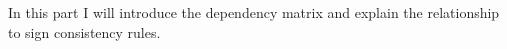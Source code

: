 In this part I will introduce the dependency matrix and explain the relationship to sign consistency rules.
